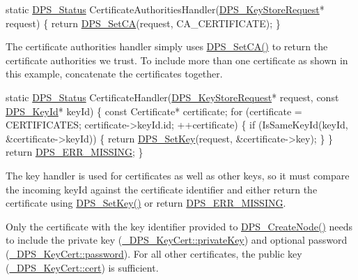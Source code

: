 \begin{DoxyCodeInclude}
\textcolor{keyword}{static} \hyperlink{group__status_ga30395a84d3cad9d4ec29848106415038}{DPS\_Status} CertificateAuthoritiesHandler(\hyperlink{group__keystore_ga7c3e50965b65334e9791780fa855ed16}{DPS\_KeyStoreRequest}* request)
\{
    \textcolor{keywordflow}{return} \hyperlink{group__keystore_ga37595f3207e42c52f7006659399135b2}{DPS\_SetCA}(request, CA\_CERTIFICATE);
\}
\end{DoxyCodeInclude}
The certificate authorities handler simply uses \hyperlink{group__keystore_ga37595f3207e42c52f7006659399135b2}{D\+P\+S\+\_\+\+Set\+C\+A()} to return the certificate authorities we trust. To include more than one certificate as shown in this example, concatenate the certificates together.


\begin{DoxyCodeInclude}
\textcolor{keyword}{static} \hyperlink{group__status_ga30395a84d3cad9d4ec29848106415038}{DPS\_Status} CertificateHandler(\hyperlink{group__keystore_ga7c3e50965b65334e9791780fa855ed16}{DPS\_KeyStoreRequest}* request, \textcolor{keyword}{const} 
      \hyperlink{struct___d_p_s___key_id}{DPS\_KeyId}* keyId)
\{
    \textcolor{keyword}{const} Certificate* certificate;
    \textcolor{keywordflow}{for} (certificate = CERTIFICATES; certificate->keyId.id; ++certificate) \{
        \textcolor{keywordflow}{if} (IsSameKeyId(keyId, &certificate->keyId)) \{
            \textcolor{keywordflow}{return} \hyperlink{group__keystore_ga15d6a9b8256b67c2ec8b1d365a98dbab}{DPS\_SetKey}(request, &certificate->key);
        \}
    \}
    \textcolor{keywordflow}{return} \hyperlink{group__status_ga5c46980c33492a8b76bffce081dbcba4}{DPS\_ERR\_MISSING};
\}
\end{DoxyCodeInclude}
The key handler is used for certificates as well as other keys, so it must compare the incoming {\ttfamily key\+Id} against the certificate identifier and either return the certificate using \hyperlink{group__keystore_ga15d6a9b8256b67c2ec8b1d365a98dbab}{D\+P\+S\+\_\+\+Set\+Key()} or return \hyperlink{group__status_ga5c46980c33492a8b76bffce081dbcba4}{D\+P\+S\+\_\+\+E\+R\+R\+\_\+\+M\+I\+S\+S\+I\+NG}.

Only the certificate with the key identifier provided to \hyperlink{group__node_gaf6641b5bbf27b2c45ac7f926b0ce4efe}{D\+P\+S\+\_\+\+Create\+Node()} needs to include the private key (\hyperlink{struct___d_p_s___key_cert_a0ba1842f3982c930ba76469349b0812d}{\+\_\+\+D\+P\+S\+\_\+\+Key\+Cert\+::private\+Key}) and optional password (\hyperlink{struct___d_p_s___key_cert_a18f3f492b66fbeb3de6a09aff54369cf}{\+\_\+\+D\+P\+S\+\_\+\+Key\+Cert\+::password}). For all other certificates, the public key (\hyperlink{struct___d_p_s___key_cert_a2783654ef73f2cc58911f40cd6e4f6ba}{\+\_\+\+D\+P\+S\+\_\+\+Key\+Cert\+::cert}) is sufficient.

